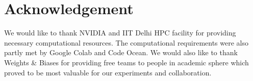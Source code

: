 \section*{Acknowledgement}
We would like to thank NVIDIA and IIT Delhi HPC facility for providing necessary computational resources. The computational requirements were also partly met by Google Colab and Code Ocean. We would also like to thank Weights \& Biases for providing free teams to people in academic sphere which proved to be most valuable for our experiments and collaboration.